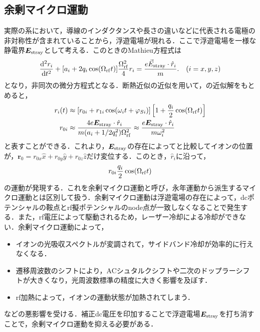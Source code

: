 \subsection{余剰マイクロ運動\cite{Berkeland_1998}}
実際の系において，導線のインダクタンスや長さの違いなどに代表される電極の非対称性が含まれていることから，浮遊電場が現れる．ここで浮遊電場を一様な静電界$\bm{E}_{\rm stray}$として考える．このときのMathieu方程式は
\large
\begin{align}\label{eq:stray_mathieu_eq}
	\frac{{\rm d^2}r_i}{{\rm d}t^2} + [a_i + 2q_i \cos (\Omega_{\rm rf} t)]\frac{\Omega_{\rm rf}^2}{4}r_i = \frac{e\vec{E}_{\rm stray}\cdot \hat{r}_i}{m}. \quad (i = x,y,z)
\end{align}
\normalsize
となり，非同次の微分方程式となる．断熱近似の近似を用いて，の近似解をもとめると，
\large
\begin{align}\label{eq:stray_mathieu_kai}
r_i(t) &\approx [r_{0i} + r_{1i}\cos(\omega_i t + \varphi_{Si})]\left[ 1 + \frac{q_i}{2}\cos(\Omega_{\rm rf} t)\right]  \\
r_{0i} &\approx \frac{4e \bm{E}_{\rm stray} \cdot \hat{r}_i}{m(a_i + 1/2 q^2_i)\Omega_{\rm rf}^2} \approx \frac{e \bm{E}_{\rm stray} \cdot \hat{r}_i}{m\omega_i^2}
\end{align}
\normalsize
と表すことができる．これより，$\bm{E}_{\rm stray}$の存在によってと比較してイオンの位置が，$\bm{r}_0 = r_{0x}\hat{x} + r_{0y}\hat{y} + r_{0z}\hat{z}$だけ変位する．このとき，$\hat{r}_i$に沿って，
\large
\begin{align}
r_{0i}\frac{q_i}{2} \cos(\Omega_{\rm rf}t)
\end{align}
\normalsize
の運動が発現する．これを余剰マイクロ運動と呼び，永年運動から派生するマイクロ運動とは区別して扱う．余剰マイクロ運動は浮遊電場の存在によって，dcポテンシャルの鞍点とrf擬ポテンシャルのnode点が一致しなくなることで発生する．また，rf電圧によって駆動されるため，レーザー冷却による冷却ができない．余剰マイクロ運動によって，
\begin{itemize}
\item イオンの光吸収スペクトルが変調されて，サイドバンド冷却が効率的に行えなくなる．
\item 遷移周波数のシフトにより，ACシュタルクシフトや二次のドップラーシフトが大きくなり，光周波数標準の精度に大きく影響を及ぼす．
\item rf加熱によって，イオンの運動状態が加熱されてしまう．
\end{itemize}
などの悪影響を受ける\cite{Timm_2015}．補正dc電圧を印加することで浮遊電場$\bm{E}_{\rm stray}$を打ち消すことで，余剰マイクロ運動を抑える必要がある．

